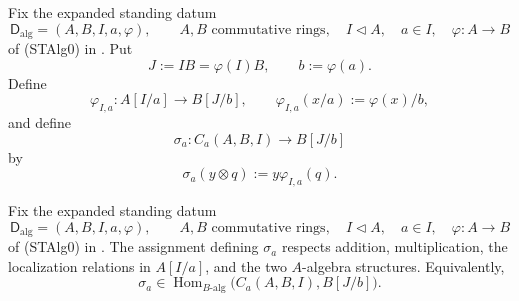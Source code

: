 \begin{definition}
  \label{def:nagata-strict-chart-to-extended-blowup-chart}

  Fix the expanded standing datum
  \[
    \mathsf D_{\mathrm{alg}}=(A,B,I,a,\varphi),\qquad
    A,B\text{ commutative rings},\quad
    I\triangleleft A,\quad a\in I,\quad
    \varphi\colon A\to B
  \]
  of (STAlg0) in
  .
  Put
  \[
    J:=IB=\varphi(I)B,\qquad b:=\varphi(a).
  \]
  Define
  \[
    \varphi_{I,a}\colon A[I/a]\to B[J/b],
    \qquad \varphi_{I,a}(x/a):=\varphi(x)/b,
  \]
  and define
  \[
    \sigma_a\colon C_a(A,B,I)\longrightarrow B[J/b]
  \]
  by
  \[
    \sigma_a(y\otimes q):=y\varphi_{I,a}(q).
  \]
\end{definition}

\begin{lemma}
  \label{lemma:nagata-strict-chart-to-extended-blowup-chart}

  Fix the expanded standing datum
  \[
    \mathsf D_{\mathrm{alg}}=(A,B,I,a,\varphi),\qquad
    A,B\text{ commutative rings},\quad
    I\triangleleft A,\quad a\in I,\quad
    \varphi\colon A\to B
  \]
  of (STAlg0) in
  .
  The assignment defining $\sigma_a$ respects addition, multiplication, the
  localization relations in $A[I/a]$, and the two $A$-algebra structures.
  Equivalently,
  \[
    \sigma_a\in
      \operatorname{Hom}_{B\text{-alg}}
        \bigl(C_a(A,B,I),B[J/b]\bigr).
  \]
\end{lemma}

